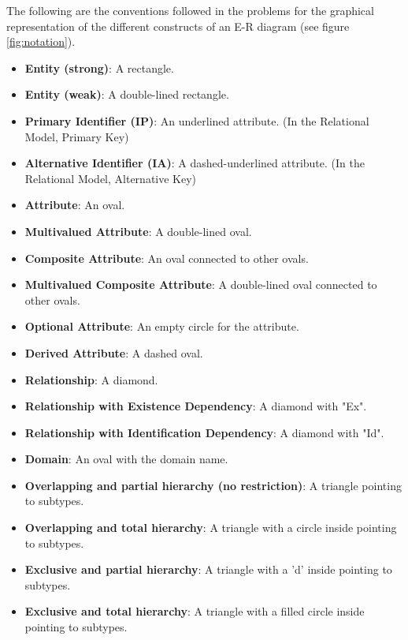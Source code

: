\documentclass{article}
\begin{document}
The following are the conventions followed in the problems for the graphical representation of the different constructs of an E-R diagram (see figure \ref{fig:notation}).

\begin{itemize}
    \item \textbf{Entity (strong)}: A rectangle.
    \item \textbf{Entity (weak)}: A double-lined rectangle.
    \item \textbf{Primary Identifier (IP)}: An underlined attribute. (In the Relational Model, Primary Key)
    \item \textbf{Alternative Identifier (IA)}: A dashed-underlined attribute. (In the Relational Model, Alternative Key)
    \item \textbf{Attribute}: An oval.
    \item \textbf{Multivalued Attribute}: A double-lined oval.
    \item \textbf{Composite Attribute}: An oval connected to other ovals.
    \item \textbf{Multivalued Composite Attribute}: A double-lined oval connected to other ovals.
    \item \textbf{Optional Attribute}: An empty circle for the attribute.
    \item \textbf{Derived Attribute}: A dashed oval.
    \item \textbf{Relationship}: A diamond.
    \item \textbf{Relationship with Existence Dependency}: A diamond with "Ex".
    \item \textbf{Relationship with Identification Dependency}: A diamond with "Id".
    \item \textbf{Domain}: An oval with the domain name.
    \item \textbf{Overlapping and partial hierarchy (no restriction)}: A triangle pointing to subtypes.
    \item \textbf{Overlapping and total hierarchy}: A triangle with a circle inside pointing to subtypes.
    \item \textbf{Exclusive and partial hierarchy}: A triangle with a 'd' inside pointing to subtypes.
    \item \textbf{Exclusive and total hierarchy}: A triangle with a filled circle inside pointing to subtypes.
\end{itemize}
\end{document}
